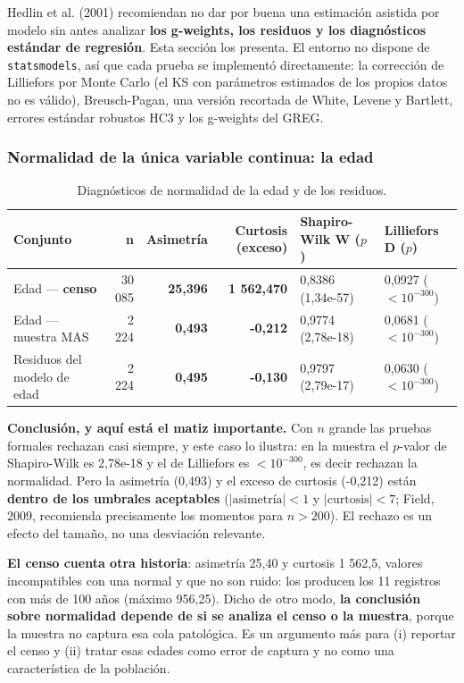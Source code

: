 Hedlin et al. (2001) recomiendan no dar por buena una estimación asistida por
modelo sin antes analizar \textbf{los g-weights, los residuos y los diagnósticos
estándar de regresión}. Esta sección los presenta. El entorno no dispone de
\texttt{statsmodels}, así que cada prueba se implementó directamente: la
corrección de Lilliefors por Monte Carlo (el KS con parámetros estimados de los
propios datos no es válido), Breusch-Pagan, una versión recortada de White,
Levene y Bartlett, errores estándar robustos HC3 y los g-weights del GREG.

\subsubsection{Normalidad de la única variable continua: la edad}

\begin{table}[H]
  \centering
  \footnotesize
  \caption{Diagnósticos de normalidad de la edad y de los residuos.}
  \label{tab:mues-normalidad}
  \begin{tabular}{@{}lrrrll@{}}
    \toprule
    \textbf{Conjunto} & \textbf{n} & \textbf{Asimetría} & \textbf{Curtosis (exceso)}
      & \textbf{Shapiro-Wilk W ($p$)} & \textbf{Lilliefors D ($p$)} \\
    \midrule
    Edad --- \textbf{censo} & 30 085 & \textbf{25,396} & \textbf{1 562,470}
      & 0,8386 (1,34e-57) & 0,0927 ($<10^{-300}$) \\
    Edad --- muestra MAS & 2 224 & \textbf{0,493} & \textbf{-0,212}
      & 0,9774 (2,78e-18) & 0,0681 ($<10^{-300}$) \\
    Residuos del modelo de edad & 2 224 & \textbf{0,495} & \textbf{-0,130}
      & 0,9797 (2,79e-17) & 0,0630 ($<10^{-300}$) \\
    \bottomrule
  \end{tabular}
\end{table}

\textbf{Conclusión, y aquí está el matiz importante.} Con $n$ grande las pruebas
formales rechazan casi siempre, y este caso lo ilustra: en la muestra el
$p$-valor de Shapiro-Wilk es 2,78e-18 y el de Lilliefors es $<10^{-300}$, es
decir rechazan la normalidad. Pero la asimetría (0,493) y el exceso de curtosis
(-0,212) están \textbf{dentro de los umbrales aceptables}
($|\text{asimetría}| < 1$ y $|\text{curtosis}| < 7$; Field, 2009, recomienda
precisamente los momentos para $n > 200$). El rechazo es un efecto del tamaño, no
una desviación relevante.

\textbf{El censo cuenta otra historia}: asimetría 25,40 y curtosis 1 562,5,
valores incompatibles con una normal y que no son ruido: los producen los 11
registros con más de 100 años (máximo 956,25). Dicho de otro modo,
\textbf{la conclusión sobre normalidad depende de si se analiza el censo o la
muestra}, porque la muestra no captura esa cola patológica. Es un argumento más
para (i) reportar el censo y (ii) tratar esas edades como error de captura y no
como una característica de la población.

